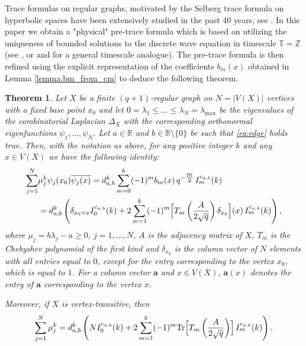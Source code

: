 \documentclass[reqno,10pt]{amsart}
\newtheorem{theorem}{Theorem}[section]
\theoremstyle{definition}
\numberwithin{equation}{section}
\begin{document}
Trace formulas on regular graphs, motivated by the Selberg trace formula on hyperbolic spaces \cite{Se56} have been extensively studied in the past 40 years, see \cite{Ah87, GLL26, Mn07, TW03, VN93}. In this paper we obtain a "physical" pre-trace formula which is based on utilizing the uniqueness of bounded solutions to the discrete wave equation in timescale $\mathbb T =\mathbb Z$ (see \cite[Theorem 3.1.]{Slav17}, or \cite{ABEPT03} and \cite{CS26} for a general timescale analogue). The pre-trace formula is then refined using the explicit representation of the coefficients $b_m(x)$ obtained in Lemma \ref{lemma:bm_from_cm} to deduce the following theorem. 

\begin{theorem} \label{th_trace_formula}
Let $X$ be a finite $(q+1)$-regular graph on $N=|V(X)|$ vertices with a fixed base point $x_0$ and let $0=\lambda_1\leq \ldots \leq \lambda_N=\lambda_{\max}$ be the eigenvalues of the combinatorial Laplacian $\Delta_X$ with the corresponding orthonormal eigenfunctions $\psi_1,\ldots,\psi_N$. Let $a\in\mathbb{R}$ and $b\in\mathbb R \setminus \{0\}$ be such that  \eqref{eq:edge} holds true. Then, with the notation as above, for any positive integer $k$ and any $x\in V(X)$ we have the following identity: 
\begin{equation}\label{eq. trace fla}
\begin{split}
        \sum_{j=1}^N& 
\mu_j^k 
\psi_j(x_0)\overline{\psi_j(x)} = d_{a,b}^k \sum_{m=0}^{k} (-1)^{m} b_m(x) \, q^{-\tfrac{m}{2}} \, I_{m}^{c_{a,b}}(k)\\
&=d_{a,b}^k \left( \delta_{x_0=x}I_0^{c_{a,b}}(k) + 2 \sum_{m=1}^{k} (-1)^{m} \Bigl[T_m\left(\frac{A}{2\sqrt{q}}\right)\delta_{x_0}\Bigr](x)\, I_{m}^{c_{a,b}}(k)\right),
\end{split}
\end{equation}
where $\mu_j=b\lambda_j-a\geq 0$, $j=1,\ldots, N$, $A$ is the adjacency matrix of $X$, $T_m$ is the Chebyshev polynomial of the first kind and $\delta_{x_0}$ is the column vector of $N$ elements with all entries equal to $0$, except for the entry corresponding to the vertex $x_0$, which is equal to $1$.  For a column vector $\mathbf a$ and $x\in V(X)$, $\mathbf a(x)$ denotes the entry of $\mathbf a$ corresponding to the vertex $x$.

\noindent Moreover, if $X$ is vertex-transitive, then 
\begin{equation}\label{eq. trace vert trans}
 \sum_{j=1}^N \mu_j^k =d_{a,b}^k \left( NI_0^{c_{a,b}}(k) + 2 \sum_{m=1}^{k} (-1)^{m}\mathrm{Tr} \Bigl[T_m\left(\frac{A}{2\sqrt{q}}\right)\Bigr]\, I_{m}^{c_{a,b}}(k)\right).
\end{equation}
\end{theorem}
\end{document}

